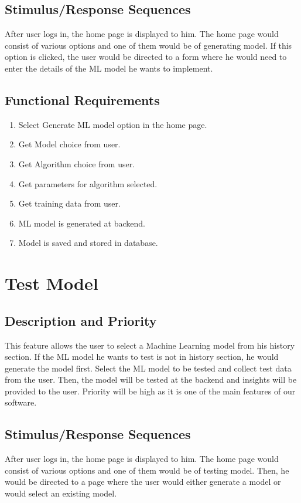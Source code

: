 \documentclass{scrreprt}
\begin{document}
\subsection{Stimulus/Response Sequences}
After user logs in, the home page is displayed to him. The home page would consist of various options and one of them would be of generating model. If this option is clicked, the user would be directed to a form where he would need to enter the details of the ML model he wants to implement.  

\subsection{Functional Requirements}
\begin{enumerate}
\item Select Generate ML model option in the home page.
\item Get Model choice from user.
\item Get Algorithm choice from user.
\item Get parameters for algorithm selected.
\item Get training data from user.
\item ML model is generated at backend.
\item Model is saved and stored in database.
\end{enumerate}

\section{Test Model}

\subsection{Description and Priority}
This feature allows the user to select a Machine Learning model from his history section. If the ML model he wants to test is not in history section, he would generate the model first. Select the ML model to be tested and collect test data from the user. Then, the model will be tested at the backend and insights will be provided to the user. Priority will be high as it is one of the main features of our software.

\subsection{Stimulus/Response Sequences}
 After user logs in, the home page is displayed to him. The home page would consist of various options and one of them would be of testing model. Then, he would be directed to a page where the user would either generate a model or would select an existing model.
\end{document}
